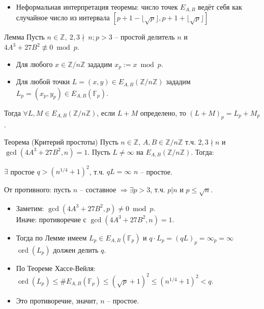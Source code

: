 \documentclass{beamer}
\begin{document}
\begin{frame}
    \begin{itemize}
        \item Неформальная интерпретация теоремы: число точек $E_{A,B}$ ведёт себя как случайное число из интервала $\left[p+1-\lfloor\sqrt{p}\rfloor, p+1+\lfloor\sqrt{p}\rfloor \right]$
    \end{itemize}
\end{frame}

\begin{frame}
\begin{block}{Лемма}
    Пусть $n \in \mathbb{Z},\ 2,3\nmid \ n; p>3$ -- простой делитель $n$ и $4A^3 + 27B^2 \not\equiv 0\bmod p$.
    \begin{itemize}
        \item Для любого $x \in \mathbb{Z}/n\mathbb{Z}$ зададим $x_p := x\bmod p$.
        \item Для любой точки $L = (x,y) \in E_{A,B}( \mathbb{Z}/n\mathbb{Z})$ зададим $L_p = (x_p, y_p) \in E_{A,B}(\mathbb{F}_p)$.  %
    \end{itemize}  
    
    Тогда $\forall L, M \in E_{A,B}(\mathbb{Z}/n\mathbb{Z})$, если $L+M$ определено, то $(L+M)_p = L_p+M_p$.
\end{block}
\end{frame}

\begin{frame}
\begin{block}{Теорема (Критерий простоты)}
    \label{t3}
    Пусть $n \in \mathbb{Z}$, $A, B \in \mathbb{Z}/n\mathbb{Z}$ т.ч. $2,3 \nmid n$ и $\gcd(4A^3 + 27B^2, n) =1$. Пусть $L \neq \infty$ на $E_{A,B}(\mathbb{Z}/n\mathbb{Z})$. Тогда:
    \begin{center}
        $\exists$ простое $q > (n^{1/4} + 1)^2$, т.ч. $qL = \infty$ \structure{$\implies$} $n$ -- простое.
    \end{center} 
\end{block}
\end{frame}

\begin{frame}
\structure{$\triangleleft$}
От противного: пусть $n$ -- составное $\Rightarrow \exists p > 3$, т.ч. $p | n$ и $p \leq \sqrt{n}$.
\begin{itemize}
    \item Заметим: $\gcd(4A^3 + 27B^2, p) \neq 0 \bmod p$.\\Иначе: противоречие с $\gcd(4A^3 + 27B^2, n) = 1$.
    \item Тогда по Лемме имеем $L_p \in E_{A,B}(\mathbb{F}_p)$ и $q\cdot L_p = (qL)_p = \infty_p = \infty$ \structure{$\Rightarrow$} $\operatorname{ord}(L_p)$ должен делить $q$.      
    \item По Теореме Хассе-Вейля: $\operatorname{ord}(L_p) \leq \#E_{A,B}(\mathbb{F}_p) \leq (\sqrt{p} + 1)^2 \leq (n^{1/4} + 1)^2 < q$. 
    \item Это противоречие, значит, $n$ -- простое. \structure{$\triangleright$}
\end{itemize}
\end{frame}
\end{document}
